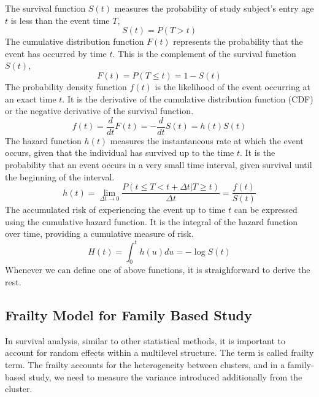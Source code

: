 The survival function $S(t)$ measures the probability of study subject's entry age $t$ is less than the event time $T$, 
\begin{equation} 
    S(t)=P(T>t)
\end{equation}
The cumulative distribution function $F(t)$ represents the probability that the event has occurred by time $t$. 
This is the complement of the survival function $S(t)$,
\begin{equation}
    F(t)=P(T\leq t)=1-S(t)
\end{equation}
The probability density function $f(t)$ is the likelihood of the event occurring at an exact time $t$. 
It is the derivative of the cumulative distribution function (CDF) or the negative derivative of the survival function. 
\begin{equation}
    f(t)=\frac{d}{dt}F(t)=-\frac{d}{dt}S(t)=h(t)S(t)
\end{equation}
The hazard function $h(t)$ measures the instantaneous rate at which the event occurs, given that the individual has survived up to the time $t$. 
It is the probability that an event occurs in a very small time interval, given survival until the beginning of the interval. 
\begin{equation}
    h(t)=\lim_{\Delta t\rightarrow 0}\frac{P(t\leq T<t+\Delta t|T\geq t)}{\Delta t}=\frac{f(t)}{S(t)}
\end{equation}
The accumulated risk of experiencing the event up to time $t$ can be expressed using the cumulative hazard function. 
It is the integral of the hazard function over time, providing a cumulative measure of risk. 
\begin{equation}
    H(t)=\int_0^t h(u)du=-\log S(t)
\end{equation}
Whenever we can define one of above functions, it is straighforward to derive the rest. 




\subsection{Frailty Model for Family Based Study}
In survival analysis, similar to other statistical methods, it is important to account for random effects within a multilevel structure.
The term is called frailty term. 
The frailty accounts for the heterogeneity between clusters, and in a family-based study, we need to measure the variance introduced additionally from the cluster. 